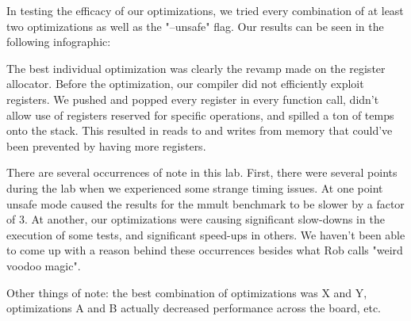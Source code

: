 \documentclass{article}
\begin{document}
In testing the efficacy of our optimizations, we tried every combination of at least two optimizations as well as the "--unsafe" flag. Our results can be seen in the following infographic:






The best individual optimization was clearly the revamp made on the register allocator. Before the optimization, our compiler did not efficiently exploit registers. We pushed and popped every register in every function call, didn't allow use of registers reserved for specific operations, and spilled a ton of temps onto the stack. This resulted in reads to and writes from memory that could've been prevented by having more registers.

There are several occurrences of note in this lab. First, there were several points during the lab when we experienced some strange timing issues. At one point unsafe mode caused the results for the mmult benchmark to be slower by a factor of 3. At another, our optimizations were causing significant slow-downs in the execution of some tests, and significant speed-ups in others. We haven't been able to come up with a reason behind these occurrences besides what Rob calls "weird voodoo magic".

Other things of note: the best combination of optimizations was X and Y, optimizations A and B actually decreased performance across the board, etc.
\end{document}
